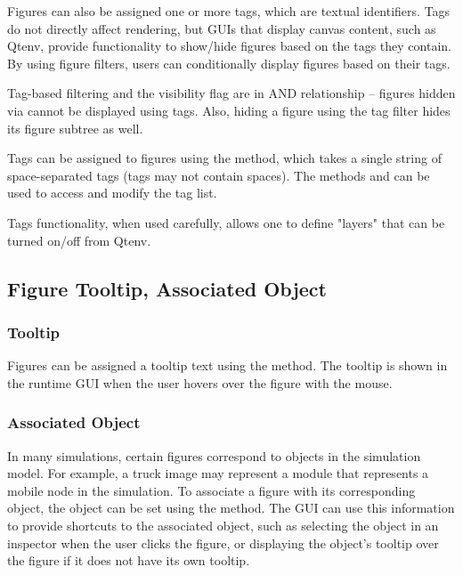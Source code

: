 Figures can also be assigned one or more tags, which are textual identifiers.
Tags do not directly affect rendering, but GUIs that display canvas content,
such as Qtenv, provide functionality to show/hide figures based on the tags they
contain. By using figure filters, users can conditionally display figures based
on their tags.

Tag-based filtering and the visibility flag are in AND relationship -- figures hidden
via  cannot be displayed using tags. Also, hiding a figure
using the tag filter hides its figure subtree as well.

Tags can be assigned to figures using the 
method, which takes a single string of space-separated tags (tags may not
contain spaces). The methods  and  can
be used to access and modify the tag list.

Tags functionality, when used carefully, allows one to define "layers"
that can be turned on/off from Qtenv.



\subsection{Figure Tooltip, Associated Object}
\label{sec:graphics:figure-tooltip-associated-object}

\subsubsection{Tooltip}
\label{sec:graphics:figure-tooltip}

Figures can be assigned a tooltip text using the  method.
The tooltip is shown in the runtime GUI when the user hovers over the figure
with the mouse.

\subsubsection{Associated Object}
\label{sec:graphics:figure-associated-object}

In many simulations, certain figures correspond to objects in the simulation
model. For example, a truck image may represent a module that represents a
mobile node in the simulation. To associate a figure with its corresponding
object, the object can be set using the  method.
The GUI can use this information to provide shortcuts to the associated object,
such as selecting the object in an inspector when the user clicks the figure, or
displaying the object's tooltip over the figure if it does not have its own
tooltip.

